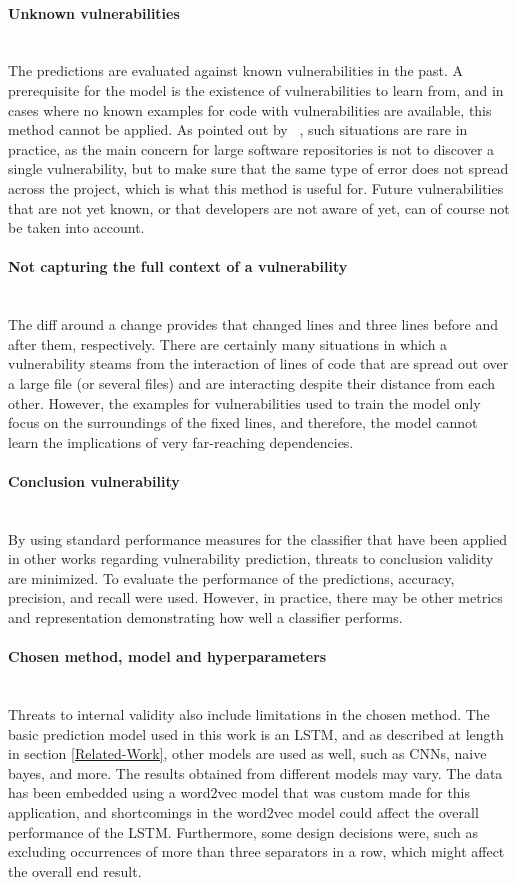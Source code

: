 \documentclass[
	a4paper,
	pagesize,
	pdftex,
	12pt,
	twoside, %
	BCOR=5mm, %
	ngerman,
	fleqn,
	final,
	]{scrartcl}
\begin{document}
\paragraph{Unknown vulnerabilities}\mbox{}\\
The predictions are evaluated against known vulnerabilities in the past. A prerequisite for the model is the existence of vulnerabilities to learn from, and in cases where no known examples for code with vulnerabilities are available, this method cannot be applied. As pointed out by ~\cite{Yamaguchi.2012}, such situations are rare in practice, as the main concern for large software repositories is not to discover a single vulnerability, but to make sure that the same type of error does not spread across the project, which is what this method is useful for. Future vulnerabilities that are not yet known, or that developers are not aware of yet, can of course not be taken into account.
\paragraph{Not capturing the full context of a vulnerability}\mbox{}\\
The diff around a change provides that changed lines and three lines before and after them, respectively. There are certainly many situations in which a vulnerability steams from the interaction of lines of code that are spread out over a large file (or several files) and are interacting despite their distance from each other. However, the examples for vulnerabilities used to train the model only focus on the surroundings of the fixed lines, and therefore, the model cannot learn the implications of very far-reaching dependencies.\\
\paragraph{Conclusion vulnerability}\mbox{}\\
By using standard performance measures for the classifier that have been applied in other works regarding vulnerability prediction, threats to conclusion validity are minimized. To evaluate the performance of the predictions, accuracy, precision, and recall were used. However, in practice, there may be other metrics and representation demonstrating how well a classifier performs.
\paragraph{Chosen method, model and hyperparameters}\mbox{}\\
Threats to internal validity also include limitations in the chosen method. The basic prediction model used in this work is an LSTM, and as described at length in section \ref{Related-Work}, other models are used as well, such as CNNs, naive bayes, and more. The results obtained from different models may vary. The data has been embedded using a word2vec model that was custom made for this application, and shortcomings in the word2vec model could affect the overall performance of the LSTM. Furthermore, some design decisions were, such as excluding occurrences of more than three separators in a row, which might affect the overall end result.  
\end{document}
